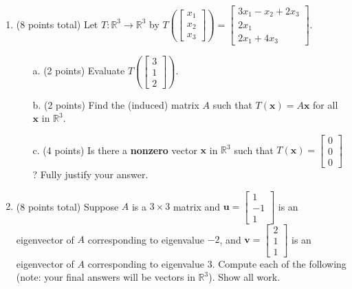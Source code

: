 \documentclass[12pt]{extarticle}
\begin{document}
\begin{enumerate}

\item (8 points total) Let $T:\mathbb{R}^3\to\mathbb{R}^3$ by $T\left(\begin{bmatrix} x_1\\ x_2\\x_3\end{bmatrix}\right)=\begin{bmatrix} 3x_1-x_2+2x_3\\ 2x_1\\ 2x_1+4x_3\end{bmatrix}$.

    
     \begin{itemize} 
     \item[a.] (2 points) Evaluate $T\left(\begin{bmatrix} 3 \\1 \\2 \end{bmatrix}\right)$.

     \vspace{1.5in}

     
     \item[b.] (2 points) Find the (induced) matrix $A$ such that $T(\mathbf{x})=A\mathbf{x}$ for all $\mathbf{x}$ in $\mathbb{R}^3$. 

\vspace{1.5in}
     \item[c.] (4 points) Is there a \textbf{nonzero} vector $\mathbf{x}$ in $\mathbb{R}^3$ such that $T(\mathbf{x})=\begin{bmatrix} 0\\ 0\\ 0\end{bmatrix}$? Fully justify your answer. 

     \vspace{3in}

\end{itemize}

\newpage

\item (8 points total) Suppose $A$ is a $3\times 3$ matrix and $\mathbf{u}=\begin{bmatrix} 1 \\ -1\\1 \end{bmatrix}$ is an eigenvector of $A$ corresponding to eigenvalue $-2$, and $\mathbf{v}=\begin{bmatrix} 2 \\ 1 \\ 1\end{bmatrix}$ is an eigenvector of $A$ corresponding to eigenvalue $3$.  Compute each of the following (note: your final answers will be vectors in $\mathbb{R}^3$). Show all work.


\end{enumerate}
\end{document}
